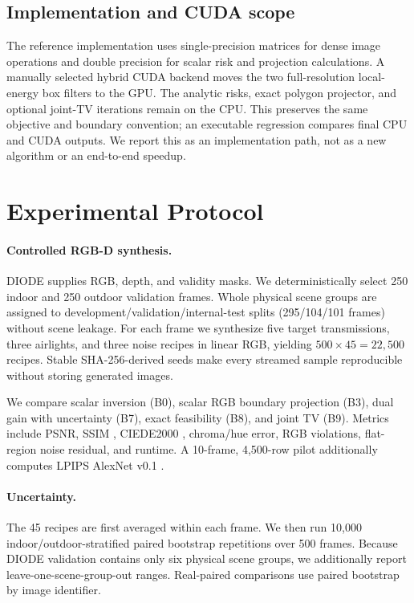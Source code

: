 \documentclass[10pt,twocolumn]{article}
\begin{document}
\subsection{Implementation and CUDA scope}
The reference implementation uses single-precision matrices for dense image operations and
double precision for scalar risk and projection calculations. A manually selected hybrid CUDA
backend moves the two full-resolution local-energy box filters to the GPU. The analytic risks,
exact polygon projector, and optional joint-TV iterations remain on the CPU. This preserves the
same objective and boundary convention; an executable regression compares final CPU and CUDA
outputs. We report this as an implementation path, not as a new algorithm or an end-to-end speedup.

\section{Experimental Protocol}
\paragraph{Controlled RGB-D synthesis.}
DIODE \cite{vasiljevic2019diode} supplies RGB, depth, and validity masks. We deterministically
select 250 indoor and 250 outdoor validation frames. Whole physical scene groups are assigned to
development/validation/internal-test splits (295/104/101 frames) without scene leakage. For each
frame we synthesize five target transmissions, three airlights, and three noise recipes in linear
RGB, yielding $500\times45=22{,}500$ recipes. Stable SHA-256-derived seeds make every streamed
sample reproducible without storing generated images.

We compare scalar inversion (B0), scalar RGB boundary projection (B3), dual gain with uncertainty
(B7), exact feasibility (B8), and joint TV (B9). Metrics include PSNR, SSIM
\cite{wang2004ssim}, CIEDE2000 \cite{sharma2005ciede}, chroma/hue error, RGB violations,
flat-region noise residual, and runtime. A 10-frame, 4,500-row pilot additionally computes LPIPS
AlexNet v0.1 \cite{zhang2018lpips}.

\paragraph{Uncertainty.}
The 45 recipes are first averaged within each frame. We then run 10,000 indoor/outdoor-stratified
paired bootstrap repetitions over 500 frames. Because DIODE validation contains only six physical
scene groups, we additionally report leave-one-scene-group-out ranges. Real-paired comparisons use
paired bootstrap by image identifier.
\end{document}
